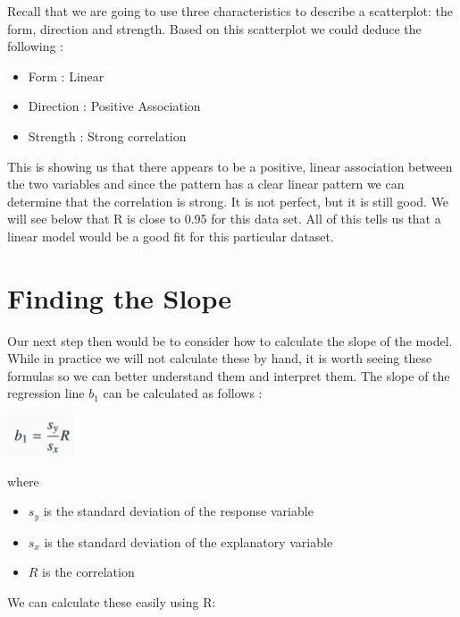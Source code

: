 \documentclass[
  letterpaper,
  DIV=11,
  numbers=noendperiod]{scrreprt}
\providecommand{\tightlist}{%
  \setlength{\itemsep}{0pt}\setlength{\parskip}{0pt}}\usepackage{longtable,booktabs,array}
\begin{document}
Recall that we are going to use three characteristics to describe a
scatterplot: the form, direction and strength. Based on this scatterplot
we could deduce the following :

\begin{itemize}
\tightlist
\item
  Form : Linear
\item
  Direction : Positive Association
\item
  Strength : Strong correlation
\end{itemize}

This is showing us that there appears to be a positive, linear
association between the two variables and since the pattern has a clear
linear pattern we can determine that the correlation is strong. It is
not perfect, but it is still good. We will see below that R is close to
0.95 for this data set. All of this tells us that a linear model would
be a good fit for this particular dataset.

\section*{Finding the Slope}\label{finding-the-slope}


Our next step then would be to consider how to calculate the slope of
the model. While in practice we will not calculate these by hand, it is
worth seeing these formulas so we can better understand them and
interpret them. The slope of the regression line \(b_1\) can be
calculated as follows :

\includegraphics[width=0.15\textwidth,height=\textheight]{./images/LMR_4.jpg}

where

\begin{itemize}
\tightlist
\item
  \(s_y\) is the standard deviation of the response variable
\item
  \(s_x\) is the standard deviation of the explanatory variable
\item
  \(R\) is the correlation
\end{itemize}

We can calculate these easily using R:
\end{document}
